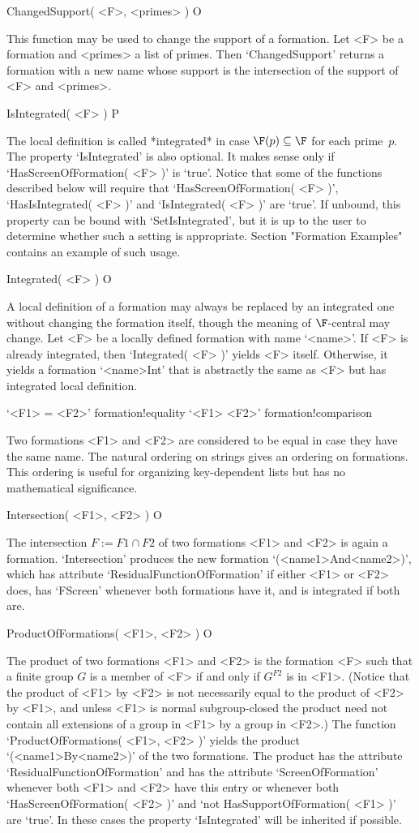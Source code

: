 \> ChangedSupport( <F>, <primes> ) O

This function may be used to change the support of a formation. Let <F>
be a formation and <primes> a list of primes. Then `ChangedSupport'
returns a formation with a new name whose support is the intersection 
of the support of <F> and <primes>.

\> IsIntegrated( <F> ) P

The local definition  is called *integrated* in case $\F(p) \subseteq
\F$  for each  prime~$p$. The property `IsIntegrated' is also optional.
It makes sense only if `HasScreenOfFormation( <F> )' is `true'. Notice that
some of the functions described below will require that `HasScreenOfFormation(
<F> )', `HasIsIntegrated( <F> )' and `IsIntegrated( <F> )' are `true'. If
unbound, this property can be bound with `SetIsIntegrated', but it is up to the
user to determine whether such a setting is appropriate.
Section "Formation Examples" contains an example of such usage.

\> Integrated( <F> )  O

A local definition of a formation may always be replaced by an
integrated one without changing the formation itself, though the meaning
of $\F$-central may change.  Let <F> be a locally defined formation with
name `<name>'.  If <F> is already integrated, then `Integrated( <F> )' 
yields <F> itself. Otherwise, it yields a  formation `<name>Int' that is
abstractly the same as <F> but has integrated local definition.

\> `<F1> = <F2>' {formation!equality}
\> `<F1> \< <F2>' {formation!comparison}

Two formations <F1> and <F2> are considered to be equal in case they 
have the same name. The natural ordering on strings gives an ordering 
on formations. This ordering is useful for organizing key-dependent 
lists but has no mathematical significance.

\> Intersection( <F1>, <F2> ) O

The intersection $F := F1 \cap F2$ of two formations <F1> and 
<F2> is again a formation. `Intersection' produces the new formation
`(<name1>And<name2>)', which has attribute `ResidualFunctionOfFormation' if
either <F1> or <F2> does, has `FScreen' whenever both formations have it, and is
integrated if both are. 

\> ProductOfFormations( <F1>, <F2> ) O

The product of two formations <F1> and <F2> is the formation <F>
such that a finite group $G$ is a member of <F> if and only if
$G^{F2}$ is in <F1>. (Notice that the product of <F1> by <F2> is 
not necessarily equal to the product of <F2> by <F1>, and unless <F1> is normal subgroup-closed the product need not contain all extensions of a group in <F1> by a group in <F2>.) The function 
`ProductOfFormations( <F1>, <F2> )' yields the product `(<name1>By<name2>)' of the two  
formations. The product has the attribute `ResidualFunctionOfFormation' and has
the attribute  `ScreenOfFormation' whenever both <F1> and <F2> have this entry
or whenever both `HasScreenOfFormation( <F2> )' and `not HasSupportOfFormation(
<F1> )' are `true'. In these cases the property `IsIntegrated' will be inherited
if possible. 
